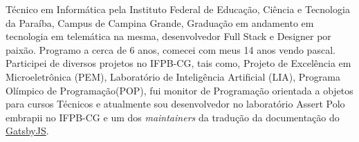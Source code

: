 \begin{cvletter}
  Técnico em Informática pela Instituto Federal de Educação, Ciência e Tecnologia da Paraíba, Campus de Campina Grande, Graduação em andamento em tecnologia em telemática na mesma, desenvolvedor Full Stack e Designer por paixão. Programo a cerca de 6 anos, comecei com meus 14 anos vendo pascal. Participei de diversos projetos no IFPB-CG, tais como, Projeto de Excelência em Microeletrônica (PEM), Laboratório de Inteligência Artificial (LIA), Programa Olímpico de Programação(POP), fui monitor de Programação orientada a objetos para cursos Técnicos e atualmente sou desenvolvedor no laboratório Assert Polo embrapii no IFPB-CG e um dos \textit{maintainers} da tradução da documentação do \href{https://www.gatsbyjs.org/}{GatsbyJS}.

\end{cvletter}